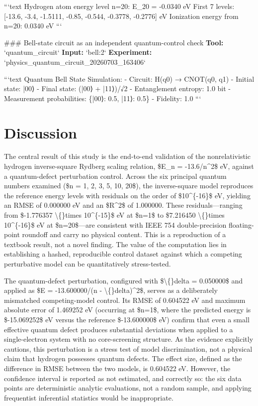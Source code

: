 \documentclass[11pt,a4paper]{article}
\begin{document}
```text
Hydrogen atom energy level n=20:
  E\_20 = -0.0340 eV
  First 7 levels: [-13.6, -3.4, -1.5111, -0.85, -0.544, -0.3778, -0.2776] eV
  Ionization energy from n=20: 0.0340 eV
```

\#\#\# Bell-state circuit as an independent quantum-control check
\textbf{Tool:} `quantum\_circuit`
\textbf{Input:} `bell:2`
\textbf{Experiment:} `physics\_quantum\_circuit\_20260703\_163406`

```text
Quantum Bell State Simulation:
- Circuit: H(q0) → CNOT(q0, q1)
- Initial state: |00⟩
- Final state: (|00⟩ + |11⟩)/√2
- Entanglement entropy: 1.0 bit
- Measurement probabilities: \{|00⟩: 0.5, |11⟩: 0.5\}
- Fidelity: 1.0
```


\section{Discussion}
The central result of this study is the end-to-end validation of the nonrelativistic hydrogen inverse-square Rydberg scaling relation, \$E\_n = -13.6/n\textasciicircum{}2\$ eV, against a quantum-defect perturbation control. Across the six principal quantum numbers examined (\$n = 1, 2, 3, 5, 10, 20\$), the inverse-square model reproduces the reference energy levels with residuals on the order of \$10\textasciicircum{}\{-16\}\$ eV, yielding an RMSE of 0.000000 eV and an \$R\textasciicircum{}2\$ of 1.000000. These residuals—ranging from \$-1.776357 \textbackslash\{\}times 10\textasciicircum{}\{-15\}\$ eV at \$n=1\$ to \$7.216450 \textbackslash\{\}times 10\textasciicircum{}\{-16\}\$ eV at \$n=20\$—are consistent with IEEE 754 double-precision floating-point roundoff and carry no physical content. This is a reproduction of a textbook result, not a novel finding. The value of the computation lies in establishing a hashed, reproducible control dataset against which a competing perturbative model can be quantitatively stress-tested.

The quantum-defect perturbation, configured with \$\textbackslash\{\}delta = 0.050000\$ and applied as \$E = -13.600000/(n - \textbackslash\{\}delta)\textasciicircum{}2\$, serves as a deliberately mismatched competing-model control. Its RMSE of 0.604522 eV and maximum absolute error of 1.469252 eV (occurring at \$n=1\$, where the predicted energy is \$-15.069252\$ eV versus the reference \$-13.600000\$ eV) confirm that even a small effective quantum defect produces substantial deviations when applied to a single-electron system with no core-screening structure. As the evidence explicitly cautions, this perturbation is a stress test of model discrimination, not a physical claim that hydrogen possesses quantum defects. The effect size, defined as the difference in RMSE between the two models, is 0.604522 eV. However, the confidence interval is reported as not estimated, and correctly so: the six data points are deterministic analytic evaluations, not a random sample, and applying frequentist inferential statistics would be inappropriate.
\end{document}
